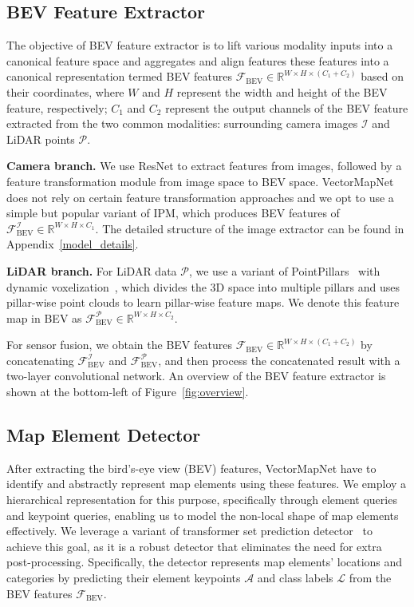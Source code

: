 \documentclass{article}
\theoremstyle{plain}
\theoremstyle{definition}
\theoremstyle{remark}
\begin{document}
\subsection{BEV Feature Extractor}
\label{sec:bev_backbone}

The objective of BEV feature extractor is to lift various modality inputs into a canonical feature space and aggregates and align features these features into a canonical representation termed BEV features $\bm{\mathcal{F}}_{\mathrm{BEV}}\in\mathbb{R}^{W \times H \times (C_1+C_2)}$ based on their coordinates, where $W$ and $H$ represent the width and height of the BEV feature, respectively; $C_1$ and $C_2$ represent the output channels of the BEV feature extracted from the two common modalities: surrounding camera images $\mathcal{I}$ and LiDAR points $\mathcal{P}$. 

\noindent\textbf{Camera branch.}
We use ResNet to extract features from images, followed by a feature transformation module from image space to BEV space. VectorMapNet does not rely on certain feature transformation approaches and we opt to use a simple but popular variant of IPM, which produces BEV features of $\bm{\mathcal{F}}_{\mathrm{BEV}}^\mathcal{I}\in\mathbb{R}^{W \times H \times C_1}$. The detailed structure of the image extractor can be found in Appendix~\ref{model_details}.

\noindent\textbf{LiDAR branch.}
For LiDAR data $\mathcal{P}$, we use a variant of PointPillars~\citep{lang2019pointpillars} with dynamic voxelization~\citep{zhou2020end}, which divides the 3D space into multiple pillars and uses pillar-wise point clouds to learn pillar-wise feature maps.  We denote this feature map in BEV as $\bm{\mathcal{F}}_{\mathrm{BEV}}^\mathcal{P}\in\mathbb{R}^{W \times H \times C_2}$. 

For sensor fusion, we obtain the BEV features  $\bm{\mathcal{F}}_{\mathrm{BEV}}\in\mathbb{R}^{W \times H \times (C_1+C_2)}$ by concatenating $\bm{\mathcal{F}}_{\mathrm{BEV}}^\mathcal{I}$ and $\bm{\mathcal{F}}_{\mathrm{BEV}}^\mathcal{P}$, and then process the concatenated result with a two-layer convolutional network. 
An overview of the BEV feature extractor is shown at the bottom-left of Figure~\ref{fig:overview}. 


\subsection{Map Element Detector}
\label{sec:det}
After extracting the bird's-eye view (BEV) features, VectorMapNet have to identify and abstractly represent map elements using these features. We employ a hierarchical representation for this purpose, specifically through element queries and keypoint queries, enabling us to model the non-local shape of map elements effectively. We leverage a variant of transformer set prediction detector~\citep{carion2020end} to achieve this goal, as it is a robust detector that eliminates the need for extra post-processing. Specifically, the detector represents map elements' locations and categories by predicting their element keypoints $\bm{\mathcal{A}}$ and class labels $\bm{\mathcal{L}}$ from the BEV features $\bm{\mathcal{F}}_{\mathrm{BEV}}$. 
\end{document}
